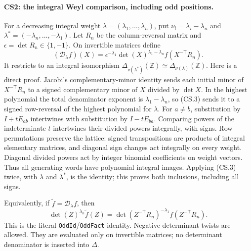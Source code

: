\documentclass[11pt,a4paper]{article}
\numberwithin{equation}{section}
\theoremstyle{remark}\newtheorem{remark}[theorem]{Remark}
\begin{document}
\paragraph{CS2: the integral Weyl comparison, including odd positions.}
For a decreasing integral weight $\lambda=(\lambda_1,\ldots,\lambda_n)$,
put $\nu_i=\lambda_i-\lambda_n$ and
$\lambda^*=(-\lambda_n,\ldots,-\lambda_1)$. Let $R_n$ be the
column-reversal matrix and $\epsilon=\det R_n\in\{1,-1\}$.
On invertible matrices define
\[
 (\mathcal D_\lambda f)(X)=
 \epsilon^{-\lambda_1}\det(X)^{\lambda_1-\lambda_n}
                      f(X^{-\mathsf T}R_n).             \tag{CS.3}
\]
It restricts to an integral isomorphism
$\Delta_{\nu(\lambda^*)}(\mathbb Z)\simeq
\Delta_{\nu(\lambda)}(\mathbb Z)$.
Here is a direct proof. Jacobi's complementary-minor identity sends
each initial minor of $X^{-\mathsf T}R_n$ to a signed complementary
minor of $X$ divided by $\det X$. In the highest polynomial the total
denominator exponent is $\lambda_1-\lambda_n$, so (CS.3) sends it
to a signed row-reversal of the highest polynomial for $\lambda$.
For $a\ne b$, substitution by $I+tE_{ab}$ intertwines with substitution
by $I-tE_{ba}$. Comparing powers of the indeterminate $t$ intertwines
their divided powers integrally, with signs. Row permutations preserve
the lattice: signed transpositions are products of integral elementary
matrices, and diagonal sign changes act integrally on every weight.
Diagonal divided powers act by integer binomial coefficients on weight
vectors. Thus all generating words have polynomial integral images.
Applying (CS.3) twice, with $\lambda$ and $\lambda^*$, is the identity;
this proves both inclusions, including all signs.

Equivalently, if $\widetilde f=\mathcal D_\lambda f$, then
\[
 \det(Z)^{\lambda_n}\widetilde f(Z)=
 \det(Z^{-\mathsf T}R_n)^{-\lambda_1}
                                    f(Z^{-\mathsf T}R_n).       \tag{CS.4}
\]
This is the literal \texttt{OddId}/\texttt{OddFact} identity. Negative
determinant twists are allowed. They are evaluated only on invertible
matrices; no determinant denominator is inserted into $\Delta$.
\end{document}
